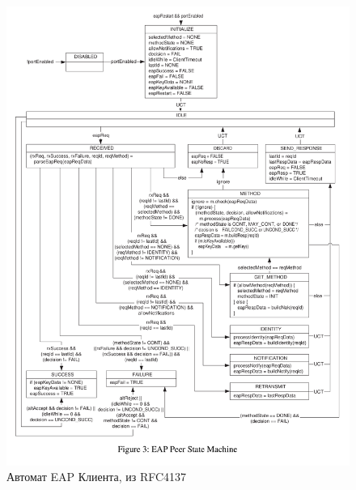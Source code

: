 \documentclass[oneside, final, 14pt]{extarticle}
\begin{document}
\begin{figure}
  \centering \includegraphics{res/eap-peer-state-machine-rfc4137.png}
  \caption{Автомат EAP Клиента, из RFC4137}
\end{figure}
\end{document}
